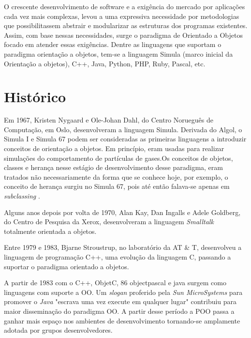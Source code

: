 \documentclass[11pt,a4paper]{article}
\begin{document}
O crescente desenvolvimento de software e a exigência do mercado por aplicações cada vez mais complexas, levou a uma expressiva necessidade por metodologias que possibilitassem abstrair e modularizar as estruturas dos programas existentes. Assim, com base nessas necessidades, surge o paradigma de Orientado a Objetos focado em atender essas exigências. Dentre as linguagens que suportam o paradigma orientação a objetos, tem-se a linguagem Simula (marco inicial da Orientação a objetos), C++, Java, Python, PHP, Ruby, Pascal, etc.

\vspace{0.2in}

\section{Histórico}

Em 1967, Kristen Nygaard e Ole-Johan Dahl, do Centro Norueguês de Computação, em Oslo, desenvolveram a linguagem Simula. Derivada do Algol, o Simula I e Simula 67 podem ser consideradas as primeiras linguagens a introduzir conceitos de orientação a objetos. Em princípio, eram usadas para realizar simulações do comportamento de partículas de gases.Os conceitos de objetos, classes e herança nesse estágio de desenvolvimento desse paradigma, eram tratados não necessariamente da forma que se conhece hoje, por exemplo, o conceito de herança surgiu no Simula 67, pois até então falava-se apenas em \textit{subclassing} \cite{black2013object}. 

\vspace{0.1in}

Alguns anos depois por volta de 1970, Alan Kay, Dan Ingalls e Adele Goldberg, do Centro de Pesquisa da Xerox, desenvolveram a linguagem \textit{Smalltalk} totalmente orientada a objetos.

\vspace{0.1in}

Entre 1979 e 1983, Bjarne Stroustrup, no laboratório da AT \& T, desenvolveu a linguagem de programação C++, uma evolução da linguagem C, passando a suportar o paradigma orientado a objetos.

\vspace{0.1in}

A partir de 1983 com o C++, ObjetC, 86 objectpascal e java surgem como linguagens com suporte a OO. Um \textit{slogan} proferido pela \textit{Sun MicroSystems} para promover o \textit{Java} "escrava uma vez execute em qualquer lugar" contribuiu para maior disseminação  do paradigma OO. A partir desse período a POO passa a ganhar mais espaço nos ambientes de desenvolvimento tornando-se amplamente adotada por grupos desenvolvedores. 
\end{document}
